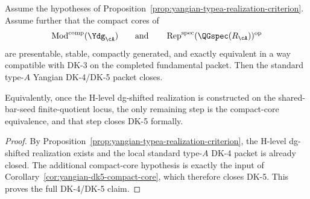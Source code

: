 \iffalse
\begin{corollary}
\label{cor:yangian-typea-realization-plus-compacts-orig}
Assume the hypotheses of
Proposition~\ref{prop:yangian-typea-realization-criterion}. Assume
further that the compact cores of
\[
\operatorname{Mod}^{\mathrm{comp}}(\Ydg_{\cA})
\qquad\text{and}\qquad
\operatorname{Rep}^{\mathrm{spec}}(\QGspec(R_{\cA}))^{\mathrm{op}}
\]
are presentable, stable, compactly generated, and exactly equivalent in
a way compatible with DK-3 on the completed fundamental packet. Then
the standard type-$A$ Yangian DK-4/DK-5 packet closes.

Equivalently, once the H-level dg-shifted realization is constructed on
the shared-bar-seed finite-quotient locus, the only remaining step is
the compact-core equivalence, and that step closes DK-5 formally.
\end{corollary}

\begin{proof}
By Proposition~\ref{prop:yangian-typea-realization-criterion}, the
H-level dg-shifted realization exists and the local standard type-$A$
DK-4 packet is already closed. The additional compact-core hypothesis
is exactly the input of
Corollary~\ref{cor:yangian-dk5-compact-core}, which therefore closes
DK-5. This proves the full DK-4/DK-5 claim.
\end{proof}

